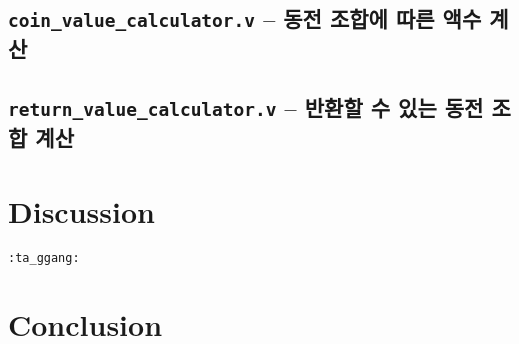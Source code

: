 \documentclass{scrartcl}
\begin{document}
\subsection{\texttt{coin\_value\_calculator.v} -- 동전 조합에 따른 액수 계산}

\subsection{\texttt{return\_value\_calculator.v} -- 반환할 수 있는 동전 조합 계산}

\section{Discussion}
\texttt{:ta\_ggang:} %

\section{Conclusion}
\end{document}
